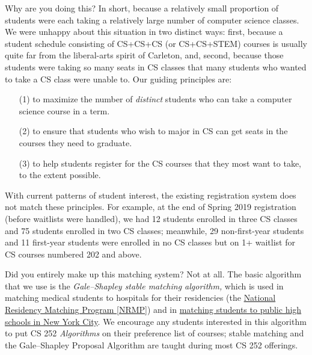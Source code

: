 \documentclass{article}
\begin{document}
\begin{description}[itemsep=0.9\baselineskip]%
\qitem Why are you doing this?
\aitem In short, because a relatively small proportion of students were each taking a relatively large number of computer science classes.  We were unhappy about this situation in two distinct ways:  first, because a student schedule consisting of CS+CS+CS (or CS+CS+STEM) courses is usually quite far from the liberal-arts spirit of Carleton, and, second, because those students were taking so many seats in CS classes that many students who wanted to take a CS class were unable to.  Our guiding principles are:
\begin{itemize}[itemsep=-0.05cm]
\item[(1)] to maximize the number of \emph{distinct} students who can take a computer science course in a term.
\item[(2)] to ensure that students who wish to major in CS can get seats in the courses they need to graduate.
\item[(3)] to help students register for the CS courses that they most want to take, to the extent possible.
\end{itemize}
With current patterns of student interest, the existing registration system does not match these principles.  For example, at the end of Spring 2019 registration (before waitlists were handled), we had 12 students enrolled in three CS classes and 75 students enrolled in two CS classes; meanwhile, 29 non-first-year students and 11 first-year students were enrolled in no CS classes but on 1+ waitlist for CS courses numbered 202 and above.


\qitem Did you entirely make up this matching system?
\aitem Not at all.  The basic algorithm that we use is the \emph{Gale--Shapley stable matching algorithm,} which is used in matching medical students to hospitals for their residencies (the \href{http://www.nrmp.org/}{National Residency Matching Program [NRMP]}) and in \href{https://www.nytimes.com/2014/12/07/nyregion/how-game-theory-helped-improve-new-york-city-high-school-application-process.html}{matching students to public high schools in New York City}.  We encourage any students interested in this algorithm to put CS 252 \emph{Algorithms} on their preference list of courses; stable matching and the Gale--Shapley Proposal Algorithm are taught during most CS 252 offerings.


\end{description}
\end{document}
